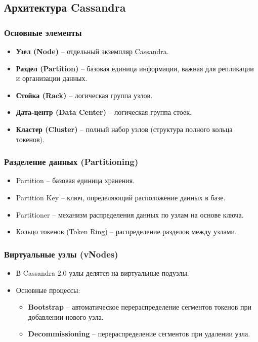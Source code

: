 \documentclass[a4paper,12pt]{article}
\begin{document}
\subsection{Архитектура Cassandra}
\subsubsection{Основные элементы}
\begin{itemize}
    \item \textbf{Узел (Node)} – отдельный экземпляр Cassandra.
    \item \textbf{Раздел (Partition)} – базовая единица информации, важная для репликации и организации данных.
    \item \textbf{Стойка (Rack)} – логическая группа узлов.
    \item \textbf{Дата-центр (Data Center)} – логическая группа стоек.
    \item \textbf{Кластер (Cluster)} – полный набор узлов (структура полного кольца токенов).
\end{itemize}

\subsubsection{Разделение данных (Partitioning)}
\begin{itemize}
    \item Partition – базовая единица хранения.
    \item Partition Key – ключ, определяющий расположение данных в базе.
    \item Partitioner – механизм распределения данных по узлам на основе ключа.
    \item Кольцо токенов (Token Ring) – распределение разделов между узлами.
\end{itemize}

\subsubsection{Виртуальные узлы (vNodes)}
\begin{itemize}
    \item В Cassandra 2.0 узлы делятся на виртуальные подузлы.
    \item Основные процессы:
    \begin{itemize}
        \item \textbf{Bootstrap} – автоматическое перераспределение сегментов токенов при добавлении нового узла.
        \item \textbf{Decommissioning} – перераспределение сегментов при удалении узла.
    \end{itemize}
\end{itemize}
\end{document}
